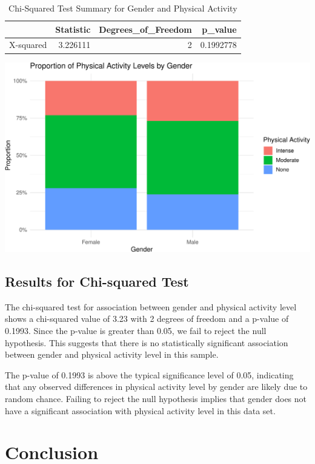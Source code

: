 \documentclass[
]{article}
\begin{document}
\begin{longtable}[t]{lrrr}
\caption{\label{tab:unnamed-chunk-4}Chi-Squared Test Summary for Gender and Physical Activity}\\
\toprule
 & Statistic & Degrees\_of\_Freedom & p\_value\\
\midrule
X-squared & 3.226111 & 2 & 0.1992778\\
\bottomrule
\end{longtable}

\includegraphics{PART-1_files/figure-latex/gender-activity-barplot-1.pdf}

\subsection{Results for Chi-squared
Test}\label{results-for-chi-squared-test}

The chi-squared test for association between gender and physical
activity level shows a chi-squared value of 3.23 with 2 degrees of
freedom and a p-value of 0.1993. Since the p-value is greater than 0.05,
we fail to reject the null hypothesis. This suggests that there is no
statistically significant association between gender and physical
activity level in this sample.

The p-value of 0.1993 is above the typical significance level of 0.05,
indicating that any observed differences in physical activity level by
gender are likely due to random chance. Failing to reject the null
hypothesis implies that gender does not have a significant association
with physical activity level in this data set.

\section{Conclusion}\label{conclusion}
\end{document}
